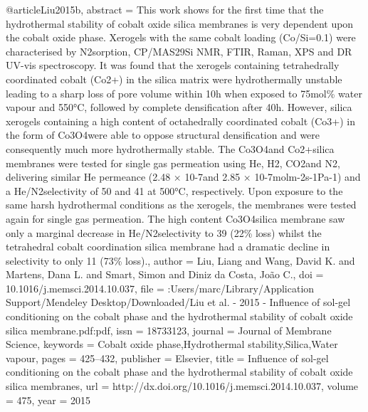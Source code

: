 @article{Liu2015b,
abstract = {This work shows for the first time that the hydrothermal stability of cobalt oxide silica membranes is very dependent upon the cobalt oxide phase. Xerogels with the same cobalt loading (Co/Si=0.1) were characterised by N2sorption, CP/MAS29Si NMR, FTIR, Raman, XPS and DR UV-vis spectroscopy. It was found that the xerogels containing tetrahedrally coordinated cobalt (Co2+) in the silica matrix were hydrothermally unstable leading to a sharp loss of pore volume within 10h when exposed to 75mol{\%} water vapour and 550°C, followed by complete densification after 40h. However, silica xerogels containing a high content of octahedrally coordinated cobalt (Co3+) in the form of Co3O4were able to oppose structural densification and were consequently much more hydrothermally stable. The Co3O4and Co2+silica membranes were tested for single gas permeation using He, H2, CO2and N2, delivering similar He permeance (2.48 × 10-7and 2.85 × 10-7molm-2s-1Pa-1) and a He/N2selectivity of 50 and 41 at 500°C, respectively. Upon exposure to the same harsh hydrothermal conditions as the xerogels, the membranes were tested again for single gas permeation. The high content Co3O4silica membrane saw only a marginal decrease in He/N2selectivity to 39 (22{\%} loss) whilst the tetrahedral cobalt coordination silica membrane had a dramatic decline in selectivity to only 11 (73{\%} loss).},
author = {Liu, Liang and Wang, David K. and Martens, Dana L. and Smart, Simon and {Diniz da Costa}, Jo{\~{a}}o C.},
doi = {10.1016/j.memsci.2014.10.037},
file = {:Users/marc/Library/Application Support/Mendeley Desktop/Downloaded/Liu et al. - 2015 - Influence of sol-gel conditioning on the cobalt phase and the hydrothermal stability of cobalt oxide silica membrane.pdf:pdf},
issn = {18733123},
journal = {Journal of Membrane Science},
keywords = {Cobalt oxide phase,Hydrothermal stability,Silica,Water vapour},
pages = {425--432},
publisher = {Elsevier},
title = {{Influence of sol-gel conditioning on the cobalt phase and the hydrothermal stability of cobalt oxide silica membranes}},
url = {http://dx.doi.org/10.1016/j.memsci.2014.10.037},
volume = {475},
year = {2015}
}
